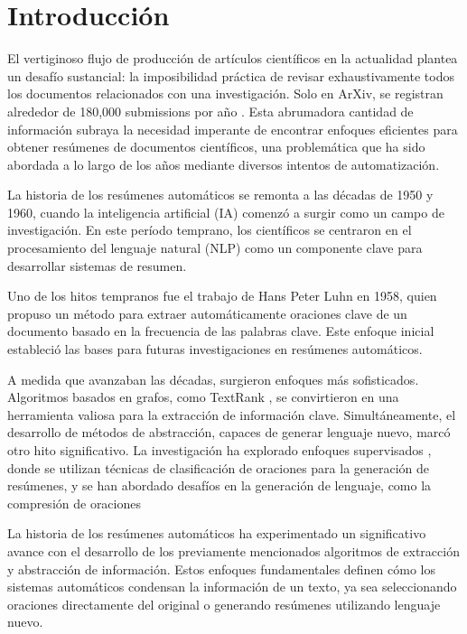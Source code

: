 \chapter*{Introducción}\label{chapter:introduction}

    El vertiginoso flujo de producción de artículos científicos en la actualidad plantea un desafío sustancial: la imposibilidad práctica de revisar exhaustivamente todos los documentos relacionados con una investigación. Solo en ArXiv, se registran alrededor de 180,000 submissions por año \cite{arxiv}. Esta abrumadora cantidad de información subraya la necesidad imperante de encontrar enfoques eficientes para obtener resúmenes de documentos científicos, una problemática que ha sido abordada a lo largo de los años mediante diversos intentos de automatización.

    La historia de los resúmenes automáticos se remonta a las décadas de 1950 y 1960, cuando la inteligencia artificial (IA) comenzó a surgir como un campo de investigación. En este período temprano, los científicos se centraron en el procesamiento del lenguaje natural (NLP) como un componente clave para desarrollar sistemas de resumen.

    Uno de los hitos tempranos fue el trabajo de Hans Peter Luhn en 1958\cite{luhunetall1958}, quien propuso un método para extraer automáticamente oraciones clave de un documento basado en la frecuencia de las palabras clave. Este enfoque inicial estableció las bases para futuras investigaciones en resúmenes automáticos.

    A medida que avanzaban las décadas, surgieron enfoques más sofisticados. Algoritmos basados en grafos, como TextRank \cite{mihalcea2004textrank}, se convirtieron en una herramienta valiosa para la extracción de información clave. Simultáneamente, el desarrollo de métodos de abstracción, capaces de generar lenguaje nuevo, marcó otro hito significativo. La investigación ha explorado enfoques supervisados \cite{lukasik2014}, donde se utilizan técnicas de clasificación de oraciones para la generación de resúmenes, y se han abordado desafíos en la generación de lenguaje, como la compresión de oraciones \cite{knight2005}

    La historia de los resúmenes automáticos ha experimentado un significativo avance con el desarrollo de los previamente mencionados algoritmos de extracción y abstracción de información. Estos enfoques fundamentales definen cómo los sistemas automáticos condensan la información de un texto, ya sea seleccionando oraciones directamente del original o generando resúmenes utilizando lenguaje nuevo.


